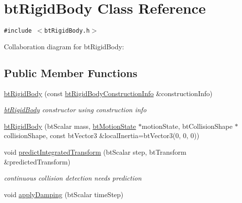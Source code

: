 \hypertarget{classbt_rigid_body}{
\section{btRigidBody Class Reference}
\label{classbt_rigid_body}
}
{\tt \#include $<$btRigidBody.h$>$}

Collaboration diagram for btRigidBody:\subsection*{Public Member Functions}
\begin{CompactItemize}
\item 
\hypertarget{classbt_rigid_body_66a55c268281f64e849851a929449ffd}{
\hyperlink{classbt_rigid_body_66a55c268281f64e849851a929449ffd}{btRigidBody} (const \hyperlink{structbt_rigid_body_1_1bt_rigid_body_construction_info}{btRigidBodyConstructionInfo} \&constructionInfo)}
\label{classbt_rigid_body_66a55c268281f64e849851a929449ffd}

\begin{CompactList}\small\item\em \hyperlink{classbt_rigid_body}{btRigidBody} constructor using construction info \item\end{CompactList}\item 
\hyperlink{classbt_rigid_body_ac9b7d050bc87644d38e9ffe4fe4c5ab}{btRigidBody} (btScalar mass, \hyperlink{classbt_motion_state}{btMotionState} $\ast$motionState, btCollisionShape $\ast$collisionShape, const btVector3 \&localInertia=btVector3(0, 0, 0))
\item 
\hypertarget{classbt_rigid_body_f7f9b40d0abcfe9927d2e9c011947cec}{
void \hyperlink{classbt_rigid_body_f7f9b40d0abcfe9927d2e9c011947cec}{predictIntegratedTransform} (btScalar step, btTransform \&predictedTransform)}
\label{classbt_rigid_body_f7f9b40d0abcfe9927d2e9c011947cec}

\begin{CompactList}\small\item\em continuous collision detection needs prediction \item\end{CompactList}\item 
\hypertarget{classbt_rigid_body_3fecb8c50d734095f33e2c7624bfba2c}{
void \hyperlink{classbt_rigid_body_3fecb8c50d734095f33e2c7624bfba2c}{applyDamping} (btScalar timeStep)}
\label{classbt_rigid_body_3fecb8c50d734095f33e2c7624bfba2c}


\end{CompactItemize}
